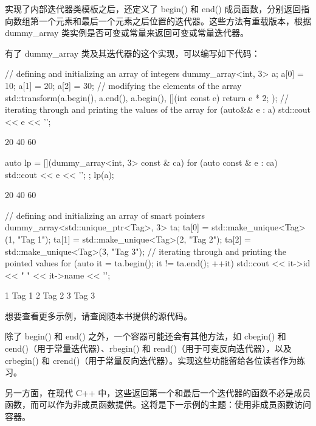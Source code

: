 实现了内部迭代器类模板之后，还定义了 begin() 和 end() 成员函数，分别返回指向数组第一个元素和最后一个元素之后位置的迭代器。这些方法有重载版本，根据 dummy\_array 类实例是否可变或常量来返回可变或常量迭代器。

有了 dummy\_array 类及其迭代器的这个实现，可以编写如下代码：

\begin{cpp}
// defining and initializing an array of integers
dummy_array<int, 3> a;
a[0] = 10;
a[1] = 20;
a[2] = 30;
// modifying the elements of the array
std::transform(a.begin(), a.end(), a.begin(),
               [](int const e) {return e * 2; });
// iterating through and printing the values of the array
for (auto&& e : a) std::cout << e << '\n';
\end{cpp}

\begin{shell}
20
40
60
\end{shell}

\begin{cpp}
auto lp = [](dummy_array<int, 3> const & ca)
{
    for (auto const & e : ca)
    std::cout << e << '\n';
};
lp(a);
\end{cpp}

\begin{shell}
20
40
60
\end{shell}

\begin{cpp}
// defining and initializing an array of smart pointers
dummy_array<std::unique_ptr<Tag>, 3> ta;
ta[0] = std::make_unique<Tag>(1, "Tag 1");
ta[1] = std::make_unique<Tag>(2, "Tag 2");
ta[2] = std::make_unique<Tag>(3, "Tag 3");
// iterating through and printing the pointed values
for (auto it = ta.begin(); it != ta.end(); ++it)
    std::cout << it->id << " " << it->name << '\n';
\end{cpp}

\begin{shell}
1 Tag 1
2 Tag 2
3 Tag 3
\end{shell}

想要查看更多示例，请查阅随本书提供的源代码。


除了 begin() 和 end() 之外，一个容器可能还会有其他方法，如 cbegin() 和 cend()（用于常量迭代器）、rbegin() 和 rend()（用于可变反向迭代器），以及 crbegin() 和 crend()（用于常量反向迭代器）。实现这些功能留给各位读者作为练习。

另一方面，在现代 C++ 中，这些返回第一个和最后一个迭代器的函数不必是成员函数，而可以作为非成员函数提供。这将是下一示例的主题：使用非成员函数访问容器。

